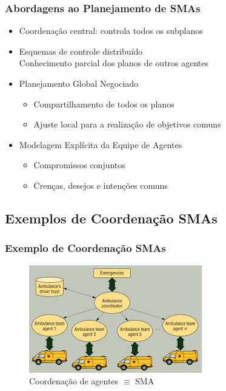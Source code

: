 \begin{frame}
\frametitle{Abordagens ao Planejamento de SMAs}

\begin{block}{}
 
\begin{itemize}
  \item Coordenação central: controla todos os subplanos
  \item Esquemas de controle distribuído\\
        Conhecimento parcial dos planos de outros agentes
  \item Planejamento Global Negociado

\begin{itemize}
  \item Compartilhamento de todos os planos
  \item Ajuste local para a realização de objetivos comuns

\end{itemize}

\item Modelagem Explícita da Equipe de Agentes
\begin{itemize}
  \item Compromissos conjuntos
   \item Crenças, desejos e intenções comuns

\end{itemize}
\end{itemize}
\end{block}

\end{frame}



\subsection{Exemplos de Coordenação SMAs}

\begin{frame}
\frametitle{Exemplo de Coordenação SMAs}

\begin{figure}[!ht]
\centering
\includegraphics[height =.6\textheight,width=.7\textwidth]{figuras/coordenacao_agentes01.png}
\caption{Coordenação de agentes $\equiv $   SMA}
\end{figure}
 \end{frame}


